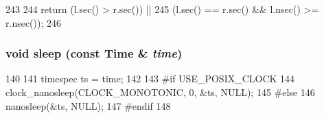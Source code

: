 \begin{DoxyCode}
243 {
244     return (l.sec() > r.sec()) ||
245         (l.sec() == r.sec() && l.nsec() >= r.nsec());
246 }
\end{DoxyCode}
\hypertarget{time_8hh_a70619da6bb4db996fece0c1fb1228e34}{
\subsubsection[{sleep}]{\setlength{\rightskip}{0pt plus 5cm}void sleep (const {\bf Time} \& {\em time})}}
\label{time_8hh_a70619da6bb4db996fece0c1fb1228e34}



\begin{DoxyCode}
140 {
141     timespec ts = time;
142 
143 #if USE_POSIX_CLOCK
144     clock_nanosleep(CLOCK_MONOTONIC, 0, &ts, NULL);
145 #else
146     nanosleep(&ts, NULL);
147 #endif
148 }
\end{DoxyCode}
